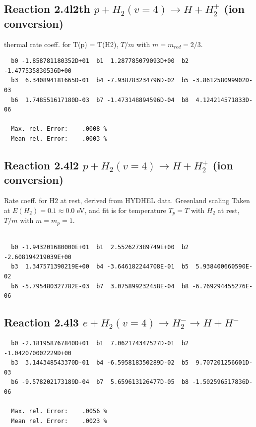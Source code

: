 \documentclass[12pt,dvipdfmx]{article}
\begin{document}
\subsection{
Reaction 2.4l2th
$ p + H_2(v=4) \rightarrow H + H_2^+$ (ion conversion)
}
thermal rate coeff. for T(p) = T(H2),
$T/m$ with $m=m_{red}=2/3$.

\begin{small}\begin{verbatim}
  b0 -1.858781180352D+01  b1  1.287785079093D+00  b2 -1.477535830536D+00
  b3  6.340894181665D-01  b4 -7.938783234796D-02  b5 -3.861258099902D-03
  b6  1.748551617180D-03  b7 -1.473148894596D-04  b8  4.124214571833D-06

  Max. rel. Error:    .0008 %
  Mean rel. Error:    .0003 %

\end{verbatim}\end{small}

\subsection{
Reaction 2.4l2
$ p + H_2(v=4) \rightarrow H + H_2^+$ (ion conversion)
}
Rate coeff. for H2 at rest, derived from HYDHEL data. Greenland scaling
Taken at $E(H_2) = 0.1 \approx 0.0$ eV,  and fit is for temperature $T_p=T$ with $H_2$ at rest,
$T/m$ with $m=m_p=1$.


\begin{small}\begin{verbatim}

  b0 -1.943201680000E+01  b1  2.552627389749E+00  b2 -2.608194219039E+00
  b3  1.347571390219E+00  b4 -3.646182244708E-01  b5  5.938400660590E-02
  b6 -5.795480327782E-03  b7  3.075899232458E-04  b8 -6.769294455276E-06

\end{verbatim}\end{small}

\newpage

\subsection{
Reaction 2.4l3
 $ e + H_2(v=4) \rightarrow H_2^- \rightarrow H + H^-$
}


\begin{small}\begin{verbatim}
  b0 -2.181958767840D+01  b1  7.062174347527D-01  b2 -1.042070002229D+00
  b3  3.144348543370D-01  b4 -6.595818350289D-02  b5  9.707201256601D-03
  b6 -9.578202173189D-04  b7  5.659613126477D-05  b8 -1.502596517836D-06

  Max. rel. Error:    .0056 %
  Mean rel. Error:    .0023 %

\end{verbatim}\end{small}
\end{document}
